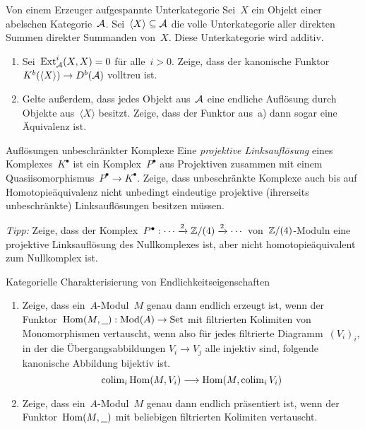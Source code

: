\documentclass{uebblatt}
\begin{document}

\begin{aufgabe}{Von einem Erzeuger aufgespannte Unterkategorie}
Sei~$X$ ein Objekt einer abelschen Kategorie~$\mathcal{A}$. Sei~$\langle X \rangle
\subseteq \mathcal{A}$ die volle Unterkategorie aller direkten Summen direkter Summanden
von~$X$. Diese Unterkategorie wird additiv.
\begin{enumerate}
\item Sei~$\mathrm{Ext}_{\mathcal{A}}^i(X,X) = 0$ für alle~$i > 0$. Zeige, dass der kanonische
Funktor~$K^b(\langle X \rangle) \to D^b(\mathcal{A})$ volltreu ist.
\item Gelte außerdem, dass jedes Objekt aus~$\mathcal{A}$ eine endliche Auflösung durch Objekte
aus~$\langle X \rangle$ besitzt. Zeige, dass der Funktor aus~a) dann sogar eine
Äquivalenz ist.
\end{enumerate}
\end{aufgabe}

\begin{aufgabe}{Auflösungen unbeschränkter Komplexe}
Eine \emph{projektive Linksauflösung} eines Komplexes~$K^\bullet$ ist ein
Komplex~$P^\bullet$ aus Projektiven zusammen mit einem
Quasiisomorphismus~$P^\bullet \to K^\bullet$. Zeige, dass unbeschränkte
Komplexe auch bis auf Homotopieäquivalenz nicht unbedingt eindeutige projektive
(ihrerseits unbeschränkte) Linksauflösungen besitzen müssen.

{\tiny\emph{Tipp:} Zeige, dass der Komplex~$P^\bullet : \cdots \xrightarrow{2} \mathbb{Z}/(4)
\xrightarrow{2} \cdots$ von~$\mathbb{Z}/(4)$-Moduln eine projektive Linksauflösung des
Nullkomplexes ist, aber nicht homotopieäquivalent zum Nullkomplex ist.\par}
\end{aufgabe}

\begin{aufgabe}{Kategorielle Charakterisierung von Endlichkeitseigenschaften}
\begin{enumerate}
\item Zeige, dass ein~$A$-Modul~$M$ genau dann endlich erzeugt ist, wenn der
Funktor~$\mathrm{Hom}(M,\underline{\ \ }) : \mathrm{Mod}(A) \to \mathrm{Set}$ mit filtrierten
Kolimiten von Monomorphismen vertauscht, wenn also für jedes filtrierte
Diagramm~$(V_i)_i$, in der die Übergangsabbildungen $V_i \to V_j$ alle injektiv
sind, folgende kanonische Abbildung bijektiv ist.
\[ \operatorname{colim}_i \mathrm{Hom}(M,V_i) \longrightarrow \mathrm{Hom}(M, \operatorname{colim}_i V_i) \]
\vspace{-1.7em}
\item Zeige, dass ein~$A$-Modul~$M$ genau dann endlich präsentiert ist, wenn
der Funktor~$\mathrm{Hom}(M,\underline{\ \ })$ mit beliebigen filtrierten Kolimiten
vertauscht.
\end{enumerate}
\end{aufgabe}
\end{document}
